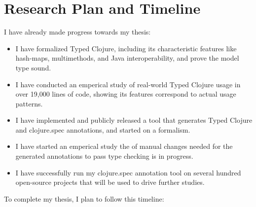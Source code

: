 \documentclass[9pt]{extarticle}
\begin{document}

\section{Research Plan and Timeline}

I have already made progress towards my thesis:

\begin{itemize}
  \item I have formalized Typed Clojure, including
    its characteristic features like hash-maps, multimethods, and Java interoperability,
    and prove the model type sound.
  \item I have conducted an emperical study of real-world Typed Clojure usage
    in over 19,000 lines of code, showing its features correspond to actual usage patterns.
  \item I have implemented and publicly released a tool that generates
    Typed Clojure and clojure.spec annotations, and started on a formalism.
  \item I have started an emperical study the of manual changes needed for the generated annotations
    to pass type checking is in progress.
  \item I have successfully run my clojure.spec annotation tool on several hundred open-source projects that
    will be used to drive further studies.
\end{itemize}

To complete my thesis, I plan to follow this timeline:
\end{document}
